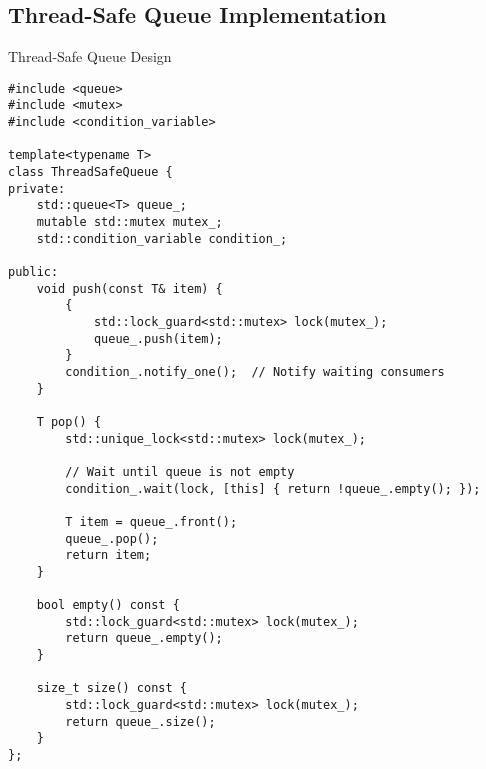 \subsection{Thread-Safe Queue Implementation}
\begin{frame}[fragile]{ Thread-Safe Queue Design}
	\begin{verbatim}
#include <queue>
#include <mutex>
#include <condition_variable>

template<typename T>
class ThreadSafeQueue {
private:
    std::queue<T> queue_;
    mutable std::mutex mutex_;
    std::condition_variable condition_;

public:
    void push(const T& item) {
        {
            std::lock_guard<std::mutex> lock(mutex_);
            queue_.push(item);
        }
        condition_.notify_one();  // Notify waiting consumers
    }

    T pop() {
        std::unique_lock<std::mutex> lock(mutex_);

        // Wait until queue is not empty
        condition_.wait(lock, [this] { return !queue_.empty(); });

        T item = queue_.front();
        queue_.pop();
        return item;
    }

    bool empty() const {
        std::lock_guard<std::mutex> lock(mutex_);
        return queue_.empty();
    }

    size_t size() const {
        std::lock_guard<std::mutex> lock(mutex_);
        return queue_.size();
    }
};
	\end{verbatim}
\end{frame}

